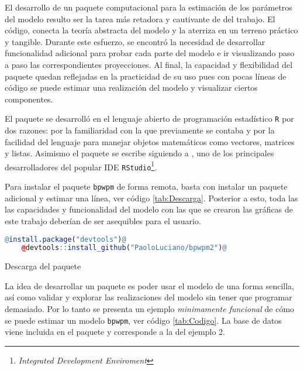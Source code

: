 \documentclass[../../Main/Main.tex]{subfiles}
\begin{document}
El desarrollo de un paquete computacional para la estimación de los parámetros del modelo resulto ser la tarea más retadora y cautivante de del trabajo. El código, conecta la teoría abstracta del modelo y la aterriza en un terreno práctico y tangible. Durante este esfuerzo, se encontró la necesidad de desarrollar funcionalidad adicional para probar cada parte del modelo e ir visualizando paso a paso las correspondientes proyecciones. Al final, la capacidad y flexibilidad del paquete quedan reflejadas en la practicidad de su uso pues con pocas líneas de código se puede estimar una realización del modelo y visualizar ciertos componentes.

El paquete se desarrolló en el lenguaje abierto de programación estadístico \verb|R| por dos razones: por la familiaridad con la que previamente se contaba y por la facilidad del lenguaje para manejar objetos matemáticos como vectores, matrices y listas.  Asimismo el paquete se escribe siguiendo a \citet{wickham2015rpck}, uno de los principales desarrolladores del popular IDE \verb|RStudio|\footnote{\emph{Integrated Development Enviroment}}. 

Para instalar el paquete \verb|bpwpm| de forma remota, basta con instalar un paquete adicional y estimar una línea, ver código \ref{tab:Descarga}. Posterior a esto, toda las las capacidades y funcionalidad del modelo con las que se crearon las gráficas de este trabajo deberían de ser asequibles para el usuario.

\begin{table}[h]
\makebox[\linewidth]{\rule{\textwidth}{0.4pt}}
\begin{lstlisting}[language = R, style = base]
	@install.package("devtools")@
	@devtools::install_github("PaoloLuciano/bpwpm2")@
\end{lstlisting}
\makebox[\linewidth]{\rule{\textwidth}{0.4pt}}
\caption{Descarga del paquete}
\label{tab:Descarga}
\end{table}

La idea de desarrollar un paquete es poder usar el modelo de una forma sencilla, así como validar y explorar las realizaciones del modelo sin tener que programar demasiado. Por lo tanto se presenta un ejemplo \textit{minimamente funcional} de cómo se puede estimar un modelo \verb|bpwpm|, ver código \ref{tab:Codigo}. La base de datos viene incluida en el paquete y corresponde a la del ejemplo 2.
\end{document}
